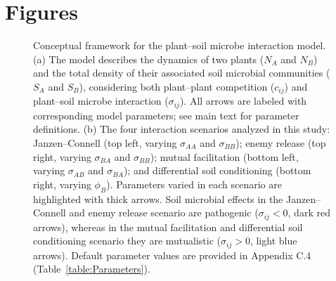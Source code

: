 \clearpage
\section{Figures}
\begin{figure}[h!]
	\centering
	\caption[Conceptual framework for the plant--soil microbe interaction model.]
		{\hspace{1mm}Conceptual framework for the plant--soil microbe interaction model. (a) The model describes the dynamics of two plants (\textit{$N_{A}$} and \textit{$N_{B}$}) and the total density of their associated soil microbial communities (\textit{$S_{A}$} and \textit{$S_{B}$}), considering both plant--plant competition ($c_{ij}$) and plant--soil microbe interaction ($\sigma_{ij}$).  All arrows are labeled with corresponding model parameters; see main text for parameter definitions. (b) The four interaction scenarios analyzed in this study: Janzen--Connell (top left, varying $\sigma_{AA}$ and $\sigma_{BB}$); enemy release (top right, varying $\sigma_{BA}$ and $\sigma_{BB}$); mutual facilitation (bottom left, varying $\sigma_{AB}$ and  $\sigma_{BA}$); and differential soil conditioning (bottom right, varying $\phi_{B}$). Parameters varied in each scenario are highlighted with thick arrows. Soil microbial effects in the Janzen--Connell and enemy release scenario are pathogenic ($\sigma_{ij}<0$, dark red arrows), whereas in the mutual facilitation and differential soil conditioning scenario they are mutualistic ($\sigma_{ij}>0$, light blue arrows). Default parameter values are provided in Appendix C.4 (Table~\ref{table:Parameters}).}
	\label{fig:Framework}
\end{figure}



